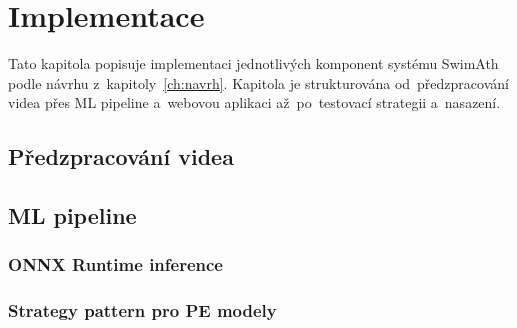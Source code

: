 \chapter{Implementace}
\label{ch:implementace}

Tato kapitola popisuje implementaci jednotlivých komponent systému SwimAth podle návrhu z~kapitoly~\ref{ch:navrh}.
Kapitola je strukturována od~předzpracování videa přes ML pipeline a~webovou aplikaci až~po~testovací strategii a~nasazení.

\section{Předzpracování videa}
\label{sec:predzpracovani}


\section{ML pipeline}
\label{sec:ml_pipeline}


\subsection{ONNX Runtime inference}


\subsection{Strategy pattern pro PE modely}


